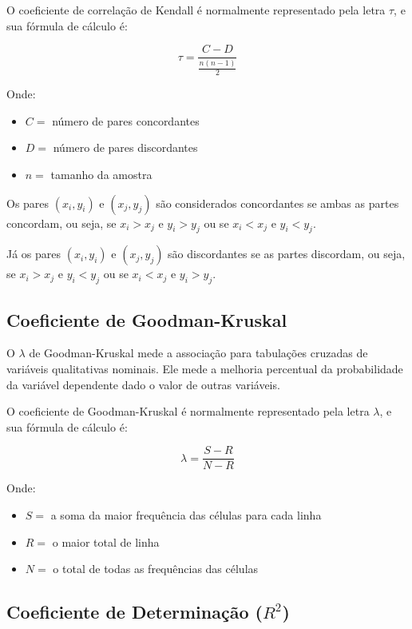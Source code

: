 \documentclass[
]{estat/estat}
\providecommand{\tightlist}{%
  \setlength{\itemsep}{0pt}\setlength{\parskip}{0pt}}\usepackage{longtable,booktabs,array}
\begin{document}
O coeficiente de correlação de Kendall é normalmente representado pela
letra \(\tau\), e sua fórmula de cálculo é:

\[
\tau = \frac{C-D}{\frac{n(n-1)}{2}}
\]

Onde:

\begin{itemize}
\tightlist
\item
  \(C =\) número de pares concordantes
\item
  \(D =\) número de pares discordantes
\item
  \(n =\) tamanho da amostra
\end{itemize}

Os pares \((x_i,y_i)\) e \((x_j,y_j)\) são considerados concordantes se
ambas as partes concordam, ou seja, se \(x_i>x_j\) e \(y_i>y_j\) ou se
\(x_i<x_j\) e \(y_i<y_j\).

Já os pares \((x_i,y_i)\) e \((x_j,y_j)\) são discordantes se as partes
discordam, ou seja, se \(x_i>x_j\) e \(y_i<y_j\) ou se \(x_i<x_j\) e
\(y_i>y_j\).

\hypertarget{coeficiente-de-goodman-kruskal}{%
\subsection{Coeficiente de
Goodman-Kruskal}\label{coeficiente-de-goodman-kruskal}}

O \(\lambda\) de Goodman-Kruskal mede a associação para tabulações
cruzadas de variáveis qualitativas nominais. Ele mede a melhoria
percentual da probabilidade da variável dependente dado o valor de
outras variáveis.

O coeficiente de Goodman-Kruskal é normalmente representado pela letra
\(\lambda\), e sua fórmula de cálculo é:

\[
\lambda = \frac{S-R}{N-R}
\]

Onde:

\begin{itemize}
\tightlist
\item
  \(S =\) a soma da maior frequência das células para cada linha
\item
  \(R =\) o maior total de linha
\item
  \(N =\) o total de todas as frequências das células
\end{itemize}

\hypertarget{coeficiente-de-determinauxe7uxe3o-r2}{%
\subsection{\texorpdfstring{Coeficiente de Determinação
(\(R^2\))}{Coeficiente de Determinação (R\^{}2)}}\label{coeficiente-de-determinauxe7uxe3o-r2}}
\end{document}

